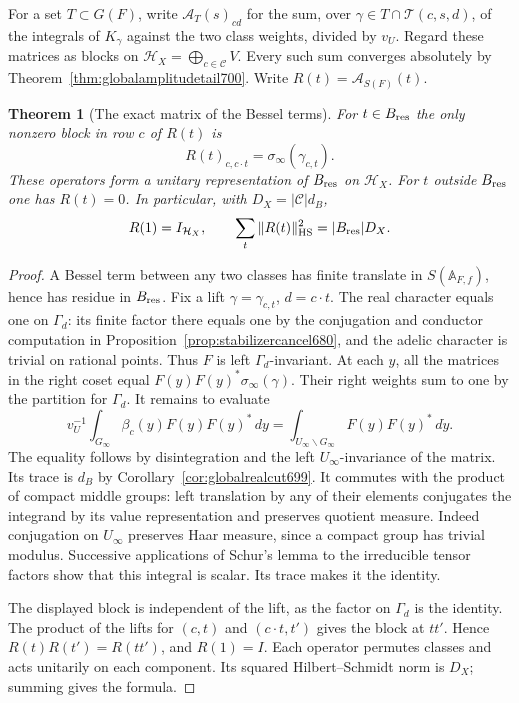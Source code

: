 \documentclass[a4paper,11pt]{article}
\newtheorem{theorem}[proposition]{Theorem}
\theoremstyle{definition}
\theoremstyle{remark}
\numberwithin{equation}{section}
\begin{document}
For a set \(T\subset G(F)\), write \(\mathcal A_T(s)_{cd}\) for
the sum, over \(\gamma\in T\cap\mathcal T(c,s,d)\), of the
integrals of \(K_\gamma\) against the two class weights, divided
by \(v_U\). Regard these matrices as blocks on
\(\mathcal H_X=\bigoplus_{c\in\mathcal C} V\). Every such sum
converges absolutely by Theorem~\ref{thm:globalamplitudetail700}.
Write \(R(t)=\mathcal A_{S(F)}(t)\).

\begin{theorem}[The exact matrix of the Bessel terms]\leavevmode
\label{thm:besselmatrix701}
For \(t\in B_{\rm res}\) the only nonzero block in row \(c\) of
\(R(t)\) is
\[
                  R(t)_{c,c\cdot t}=\sigma_\infty(\gamma_{c,t}).
\]
These operators form a unitary representation of \(B_{\rm res}\)
on \(\mathcal H_X\). For \(t\) outside \(B_{\rm res}\) one has
\(R(t)=0\). In particular, with \(D_X=|\mathcal C|d_B\),
\[
  R(1)=I_{\mathcal H_X},\qquad
  \sum_t\|R(t)\|_{\rm HS}^2=|B_{\rm res}|D_X .
\]
\end{theorem}
\begin{proof}
A Bessel term between any two classes has finite translate
in \(S(\mathbb A_{F,f})\), hence has residue in \(B_{\rm res}\).
Fix a lift \(\gamma=\gamma_{c,t}\), \(d=c\cdot t\).
The real character equals one on \(\Gamma_d\): its finite factor
there equals one by the conjugation and conductor computation
in Proposition~\ref{prop:stabilizercancel680}, and the adelic
character is trivial on rational points. Thus \(F\) is left
\(\Gamma_d\)-invariant. At each \(y\), all the matrices in the
right coset equal \(F(y)F(y)^*\sigma_\infty(\gamma)\).
Their right weights sum to one by the partition for \(\Gamma_d\).
It remains to evaluate
\[
          v_U^{-1}\int_{G_\infty}\beta_c(y)F(y)F(y)^*\,dy
             =\int_{U_\infty\backslash G_\infty}F(y)F(y)^*\,d\dot y .
\]
The equality follows by disintegration and the left
\(U_\infty\)-invariance of the matrix. Its trace is \(d_B\)
by Corollary~\ref{cor:globalrealcut699}. It commutes with the
product of compact middle groups: left translation by any
of their elements conjugates the integrand by its value
representation and preserves quotient measure. Indeed conjugation
on \(U_\infty\) preserves Haar measure, since a compact group
has trivial modulus. Successive applications of Schur's lemma
to the irreducible tensor factors show that this integral is
scalar. Its trace makes it the identity.

The displayed block is independent of the lift, as the factor
on \(\Gamma_d\) is the identity. The product of the lifts for
\((c,t)\) and \((c\cdot t,t')\) gives the block at \(tt'\).
Hence \(R(t)R(t')=R(tt')\), and \(R(1)=I\). Each operator
permutes classes and acts unitarily on each component. Its
squared Hilbert--Schmidt norm is \(D_X\); summing gives the
formula.
\end{proof}
\end{document}
